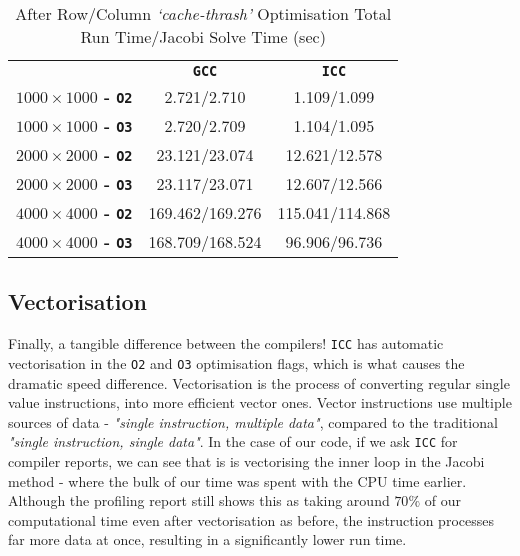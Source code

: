 \documentclass[10pt,twocolumn,a4paper]{article}
\begin{document}
\begin{table}
\small
\centering
\begin{tabular}{l|c|c}
                     & \textbf{\texttt{GCC}} & \textbf{\texttt{ICC}} \\
\textbf{$1000\times1000$ - \texttt{O2}} & 2.721/2.710     & 1.109/1.099     \\
\textbf{$1000\times1000$ - \texttt{O3}} & 2.720/2.709     & 1.104/1.095     \\
\textbf{$2000\times2000$ - \texttt{O2}} & 23.121/23.074   & 12.621/12.578   \\
\textbf{$2000\times2000$ - \texttt{O3}} & 23.117/23.071   & 12.607/12.566   \\
\textbf{$4000\times4000$ - \texttt{O2}} & 169.462/169.276 & 115.041/114.868 \\
\textbf{$4000\times4000$ - \texttt{O3}} & 168.709/168.524 & 96.906/96.736
\end{tabular}
\caption{After Row/Column \textit{`cache-thrash'} Optimisation Total Run Time/Jacobi Solve Time (sec)}
\label{cacheThrash}
\end{table}\par

\subsection{Vectorisation}
Finally, a tangible difference between the compilers! \texttt{ICC} has automatic vectorisation in the \texttt{O2} and \texttt{O3} optimisation flags, which is what causes the dramatic speed difference. Vectorisation is the process of converting regular single value instructions, into more efficient vector ones. Vector instructions use multiple sources of data - \textit{"single instruction, multiple data"}, compared to the traditional \textit{"single instruction, single data"}. In the case of our code, if we ask \texttt{ICC} for compiler reports, we can see that is is vectorising the inner loop in the Jacobi method - where the bulk of our time was spent with the CPU time earlier. Although the profiling report still shows this as taking around $70\%$ of our computational time even after vectorisation as before, the instruction processes far more data at once, resulting in a significantly lower run time. \par
\end{document}
